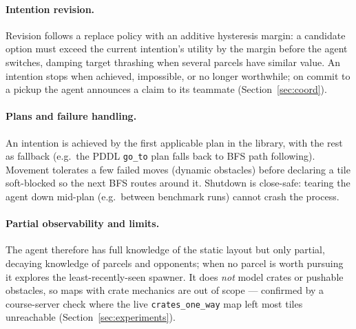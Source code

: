 \paragraph{Intention revision.} Revision follows a replace policy with an
additive hysteresis margin: a candidate option must exceed the current
intention's utility by the margin before the agent switches, damping
target thrashing when several parcels have similar value. An intention stops
when achieved, impossible, or no longer worthwhile; on commit to a pickup the
agent announces a claim to its teammate (Section~\ref{sec:coord}).

\paragraph{Plans and failure handling.} An intention is achieved by the first
applicable plan in the library, with the rest as fallback (e.g.\ the PDDL
\texttt{go\_to} plan falls back to BFS path following). Movement tolerates a few
failed moves (dynamic obstacles) before declaring a tile soft-blocked so the
next BFS routes around it. Shutdown is close-safe: tearing the agent down
mid-plan (e.g.\ between benchmark runs) cannot crash the process.

\paragraph{Partial observability and limits.} The agent therefore has full
knowledge of the static layout but only partial, decaying knowledge of parcels
and opponents; when no parcel is worth pursuing it explores the
least-recently-seen spawner. It does \emph{not} model crates or pushable
obstacles, so maps with crate mechanics are out of scope --- confirmed by a
course-server check where the live \texttt{crates\_one\_way} map left most tiles
unreachable (Section~\ref{sec:experiments}).
